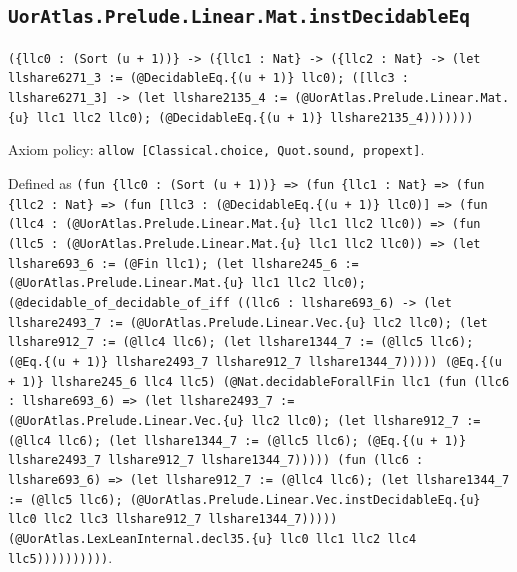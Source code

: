 \documentclass[11pt]{article}
\begin{document}
\subsection*{\texttt{UorAtlas.Prelude.Linear.Mat.instDecidableEq}}
\noindent\texttt{(\{llc0 : (Sort (u + 1))\} -> (\{llc1 : Nat\} -> (\{llc2 : Nat\} -> (let llshare6271\_3 := (@DecidableEq.\{(u + 1)\} llc0); ([llc3 : llshare6271\_3] -> (let llshare2135\_4 := (@UorAtlas.Prelude.Linear.Mat.\{u\} llc1 llc2 llc0); (@DecidableEq.\{(u + 1)\} llshare2135\_4)))))))}\par
\noindent Axiom policy: \texttt{allow [Classical.choice, Quot.sound, propext]}.\par
\noindent Defined as \texttt{(fun \{llc0 : (Sort (u + 1))\} => (fun \{llc1 : Nat\} => (fun \{llc2 : Nat\} => (fun [llc3 : (@DecidableEq.\{(u + 1)\} llc0)] => (fun (llc4 : (@UorAtlas.Prelude.Linear.Mat.\{u\} llc1 llc2 llc0)) => (fun (llc5 : (@UorAtlas.Prelude.Linear.Mat.\{u\} llc1 llc2 llc0)) => (let llshare693\_6 := (@Fin llc1); (let llshare245\_6 := (@UorAtlas.Prelude.Linear.Mat.\{u\} llc1 llc2 llc0); (@decidable\_of\_decidable\_of\_iff ((llc6 : llshare693\_6) -> (let llshare2493\_7 := (@UorAtlas.Prelude.Linear.Vec.\{u\} llc2 llc0); (let llshare912\_7 := (@llc4 llc6); (let llshare1344\_7 := (@llc5 llc6); (@Eq.\{(u + 1)\} llshare2493\_7 llshare912\_7 llshare1344\_7))))) (@Eq.\{(u + 1)\} llshare245\_6 llc4 llc5) (@Nat.decidableForallFin llc1 (fun (llc6 : llshare693\_6) => (let llshare2493\_7 := (@UorAtlas.Prelude.Linear.Vec.\{u\} llc2 llc0); (let llshare912\_7 := (@llc4 llc6); (let llshare1344\_7 := (@llc5 llc6); (@Eq.\{(u + 1)\} llshare2493\_7 llshare912\_7 llshare1344\_7))))) (fun (llc6 : llshare693\_6) => (let llshare912\_7 := (@llc4 llc6); (let llshare1344\_7 := (@llc5 llc6); (@UorAtlas.Prelude.Linear.Vec.instDecidableEq.\{u\} llc0 llc2 llc3 llshare912\_7 llshare1344\_7))))) (@UorAtlas.LexLeanInternal.decl35.\{u\} llc0 llc1 llc2 llc4 llc5))))))))))}.\par
\end{document}
